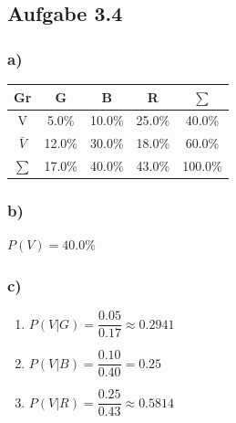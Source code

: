 \documentclass[12pt,a4paper]{article}
\begin{document}
	\subsection*{Aufgabe 3.4}
	\subsubsection*{a)}
	\begin{center}
		\begin{tabular}{c|| c|| c|| c|| c}
			\hline
			Gr & G & B & R & $\sum$ \\
			\hline
			V & 5.0\% & 10.0\% & 25.0\% & 40.0\% \\
			\hline
			$\bar{V}$ & 12.0\% & 30.0\% & 18.0\% & 60.0\% \\
			\hline
			$\sum$ & 17.0\% & 40.0\% & 43.0\% & 100.0\%\\
			\hline
		\end{tabular}
	\end{center}
	\subsubsection*{b)} $P(V) = 40.0\%$
	\subsubsection*{c)}
	\begin{enumerate}
		\item $P(V|G) = \dfrac{0.05}{0.17} \approx 0.2941$
		\item $P(V|B) = \dfrac{0.10}{0.40} = 0.25$
		\item $P(V|R) = \dfrac{0.25}{0.43} \approx 0.5814$
	\end{enumerate}
	
\end{document}
